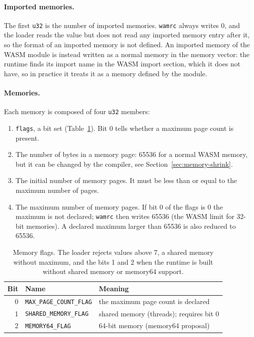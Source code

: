 \documentclass{article}
\begin{document}
\paragraph{Imported memories.}
The first \verb|u32| is the number of imported memories.
\texttt{wamrc} always writes 0, and the loader reads the value but does not read any imported memory entry after it, so the format of an imported memory is not defined.
An imported memory of the WASM module is instead written as a normal memory in the memory vector: the runtime finds its import name in the WASM import section, which it does not have, so in practice it treats it as a memory defined by the module.

\paragraph{Memories.}
Each memory is composed of four \verb|u32| members:
\begin{enumerate}
    \item \verb|flags|, a bit set (Table~\ref{table:memory-flags}). Bit 0 tells whether a maximum page count is present.
    \item The number of bytes in a memory page: 65536 for a normal WASM memory, but it can be changed by the compiler, see Section~\ref{sec:memory-shrink}.
    \item The initial number of memory pages. It must be less than or equal to the maximum number of pages.
    \item The maximum number of memory pages. If bit 0 of the flags is 0 the maximum is not declared; \texttt{wamrc} then writes 65536 (the WASM limit for 32-bit memories). A declared maximum larger than 65536 is also reduced to 65536.
\end{enumerate}

\begin{table}[H]
\centering
\begin{tabular}{rll}
    \hline
    Bit & Name & Meaning \\
    \hline
    0 & \verb|MAX_PAGE_COUNT_FLAG| & the maximum page count is declared \\
    1 & \verb|SHARED_MEMORY_FLAG| & shared memory (threads); requires bit 0 \\
    2 & \verb|MEMORY64_FLAG| & 64-bit memory (memory64 proposal) \\
    \hline
\end{tabular}
\caption{Memory flags. The loader rejects values above 7, a shared memory without maximum, and the bits 1 and 2 when the runtime is built without shared memory or memory64 support.}
\label{table:memory-flags}
\end{table}
\end{document}
